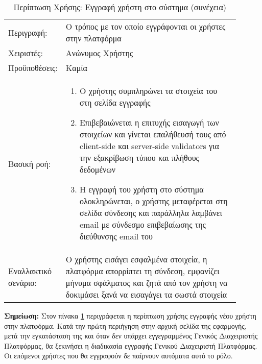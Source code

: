%
%
\begin{longtable}{|p{0.14\linewidth}|p{0.76\linewidth}|}
	\caption{Περίπτωση Χρήσης: Εγγραφή χρήστη στο σύστημα} \label{tab:use-case-signup} \\ \hline \endfirsthead
	\caption[{}]{Περίπτωση Χρήσης: Εγγραφή χρήστη στο σύστημα (συνέχεια)} \\ \endhead \endfoot
	Περιγραφή: & Ο τρόπος με τον οποίο εγγράφονται οι χρήστες στην πλατφόρμα \\ \hline
	Χειριστές: & Ανώνυμος Χρήστης \\ \hline
	Προϋποθέσεις: & Καμία \\ \hline
	Βασική ροή: &
	\begin{enumerate}
		\vspace{-1cm}
		\addtolength{\itemindent}{-0.4cm}
		\item Ο χρήστης συμπληρώνει τα στοιχεία του στη σελίδα εγγραφής
		\item Επιβεβαιώνεται η επιτυχής εισαγωγή των στοιχείων και γίνεται επαλήθευσή τους από client-side και server-side validators για την εξακρίβωση τύπου και πλήθους δεδομένων
		\item Η εγγραφή του χρήστη στο σύστημα ολοκληρώνεται, ο χρήστης μεταφέρεται στη σελίδα σύνδεσης και παράλληλα λαμβάνει email με σύνδεσμο επιβεβαίωσης της διεύθυνσης email του
		\vspace{-0.7cm}
	\end{enumerate} \\ \hline
	Εναλλακτικό σενάριο: & O χρήστης εισάγει εσφαλμένα στοιχεία, η πλατφόρμα απορρίπτει τη σύνδεση, εμφανίζει μήνυμα σφάλματος και ζητά από τον χρήστη να δοκιμάσει ξανά να εισαγάγει τα σωστά στοιχεία \\ \hline
\end{longtable}

\textbf{Σημείωση:} Στον πίνακα \ref{tab:use-case-signup} περιγράφεται η περίπτωση χρήσης εγγραφής νέου χρήστη στην πλατφόρμα. Κατά την πρώτη περιήγηση στην αρχική σελίδα της εφαρμογής, μετά την εγκατάσταση της και όταν δεν υπάρχει εγγεγραμμένος Γενικός Διαχειριστής Πλατφόρμας, θα ξεκινήσει η διαδικασία εγγραφής Γενικού Διαχειριστή Πλατφόρμας. Οι επόμενοι χρήστες που θα εγγραφούν δε παίρνουν αυτόματα αυτό το ρόλο.

